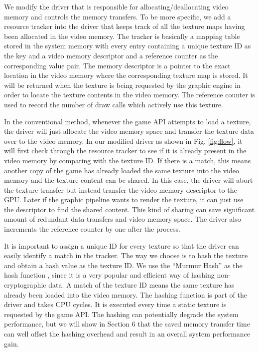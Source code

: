 \documentclass[pageno]{jpaper}
\begin{document}
We modify the driver that is responsible for allocating/deallocating video memory and controls the memory transfers. To be more specific, we
add a resource tracker into the driver that keeps track of all the texture maps having been
allocated in the video memory. The tracker is basically a mapping table stored in the system memory with every entry containing a unique
texture ID as the key and a video memory descriptor and a reference counter as
the corresponding value pair. The memory descriptor is a pointer to the exact location in the video memory where the corresponding texture map is stored. It will be returned when the texture is being requested by the graphic engine in order to locate the texture contents in the video memory. The
reference counter is used to record the number of draw calls which actively use this texture.

In the conventional method, whenever the game API attempts to load a texture, the driver will just allocate the video memory space and transfer the texture data over to the video memory. In our modified driver as shown in Fig. \ref{fig:flow}, it will first check through
the resource tracker to see if it is already present in the video memory by comparing with the texture ID. If there is a match, this means another copy of the game has already loaded the same texture into the video memory and the texture content can be shared. In this case, the driver will abort the texture transfer but instead transfer the video memory descriptor to the GPU. Later if the graphic pipeline wants to render the texture, it can just use the descriptor to find the shared content. This kind of sharing can save significant amount of redundant data transfers and video memory space. The driver also increments the reference counter by one after the process.


It is important to assign a unique ID for every texture so that the driver can easily identify a match in the tracker. The way we choose is to hash the texture and obtain a hash value as the texture ID. We use the ``Murmur Hash'' as the hash function \cite{michail2009top}, since it is a very popular and efficient
way of hashing non-cryptographic data. A match of the texture ID means the same texture has already been loaded into the video memory. The hashing function is part of the driver and takes CPU cycles. It is executed every time a static texture is requested by the game API. The hashing can potentially degrade the system performance, but we will show in Section 6 that the saved memory transfer time can well offset the hashing overhead and result in an overall system performance gain.
\end{document}

